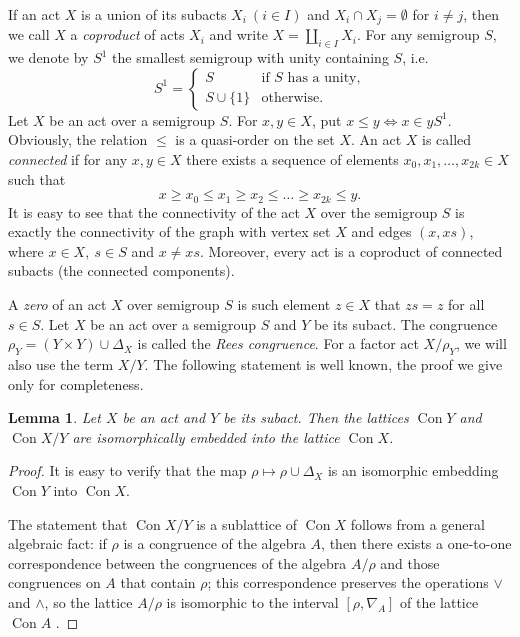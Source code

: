 \documentclass{birkau}
\numberwithin{equation}{section}
\theoremstyle{plain}
\newtheorem{lemma}[theorem]{Lemma}
\theoremstyle{definition}
\DeclareMathOperator{\Con}{Con}
\begin{document}
	If an act $X$ is a union of its subacts $ X_i\ (i \in I) $ and $ X_i \cap X_j = \emptyset $ for $i \neq j$, then we call $X$ a \textit{coproduct} of acts $X_i$ and write $ X = \coprod_{i\in I} X_i $. For any semigroup $S$, we denote by $S^1$ the smallest semigroup with unity containing $S$, i.e.
	$$ S^1 =
		\begin{cases}
			S & \text{if $S$ has a unity,}\\
			S \cup \{1\} & \text{otherwise.}
		\end{cases}
	$$
	Let $X$ be an act over a semigroup $S$. For $ x,y \in X$, put $ x \leqslant y \Leftrightarrow x \in yS^1 $. Obviously, the relation $\leqslant$ is a quasi-order on the set $X$. An act $X$ is called \textit{connected} if for any $x,y\in X$ there exists a sequence of elements $x_0,x_1,\ldots,x_{2k}\in X$ such that $$ x \geqslant x_0 \leqslant x_1 \geqslant x_2 \leqslant \ldots \geqslant x_{2k} \leqslant y. $$ It is easy to see that the connectivity of the act $X$ over the semigroup $S$ is exactly the connectivity of the graph with vertex set $X$ and edges $ (x,xs) $, where $ x \in X,\ s \in S $ and $x \neq xs$. Moreover, every act is a coproduct of connected subacts (the connected components).
	
	A \textit{zero} of an act $X$ over semigroup $S$ is such element $z \in X$ that $zs=z$ for all $s \in S$.
	Let $X$ be an act over a semigroup $S$ and $Y$ be its subact. The congruence $\rho_Y = (Y \times Y) \cup \Delta_X$ is called the \textit{Rees congruence}. For a factor act ${X}/{\rho_Y}$, we will also use the term $X/Y$. The following statement is well known, the proof we give only for completeness.
	
	\begin{lemma} \label{lemma:01}
	    Let $X$ be an act and $Y$ be its subact. Then the lattices $\Con Y$ and $\Con {X}/{Y}$ are isomorphically embedded into the lattice $\Con X$.
	\end{lemma}
	\begin{proof}
	    It is easy to verify that the map $\rho \mapsto \rho \cup \Delta_X$ is an isomorphic embedding $\Con Y$ into $\Con X$.
		
	The statement that $\Con {X}/{Y}$ is a sublattice of $\Con X$ follows from a general algebraic fact: if $\rho$ is a congruence of the algebra $A$, then there exists a one-to-one correspondence between the congruences of the algebra ${A}/{\rho}$ and those congruences on $A$ that contain $\rho$; this correspondence preserves the operations $\vee$ and $\wedge$, so the lattice ${A}/{\rho}$ is isomorphic to the interval $[\rho, \nabla_A]$ of the lattice $\Con A$ \cite[Theorem 6.20]{burris}.
    \end{proof}
	
\end{document}
